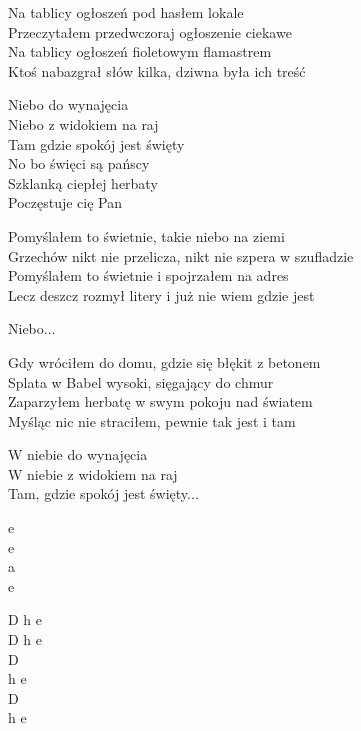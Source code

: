 \begin{text}
    Na tablicy ogłoszeń pod hasłem lokale\\
    Przeczytałem przedwczoraj ogłoszenie ciekawe\\
    Na tablicy ogłoszeń fioletowym flamastrem\\
    Ktoś nabazgrał słów kilka, dziwna była ich treść

    \vin Niebo do wynajęcia\\
    \vin Niebo z widokiem na raj\\
    \vin Tam gdzie spokój jest święty\\
    \vin No bo święci są pańscy\\
    \vin Szklanką ciepłej herbaty\\
    \vin Poczęstuje cię Pan

    Pomyślałem to świetnie, takie niebo na ziemi\\
    Grzechów nikt nie przelicza, nikt nie szpera w szufladzie\\
    Pomyślałem to świetnie i spojrzałem na adres\\
    Lecz deszcz rozmył litery i już nie wiem gdzie jest
    
    \vin Niebo...

    Gdy wróciłem do domu, gdzie się błękit z betonem\\
    Splata w Babel wysoki, sięgający do chmur\\
    Zaparzyłem herbatę w swym pokoju nad światem\\
    Myśląc nic nie straciłem, pewnie tak jest i tam

    \vin W niebie do wynajęcia\\
    \vin W niebie z widokiem na raj\\
    \vin Tam, gdzie spokój jest święty...
\end{text}
\begin{chord}
    e\\
    e\\
    a\\
    e
    
    D h e\\
    D h e\\
    D\\
    h e\\
    D\\
    h e
\end{chord}
